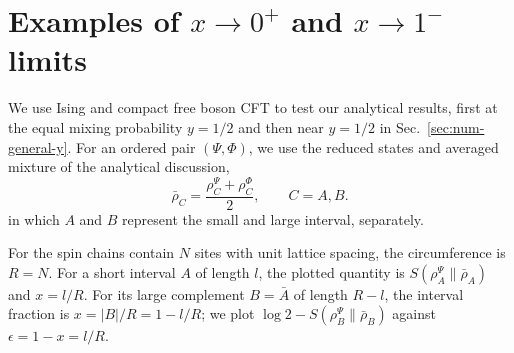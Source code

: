 \documentclass[11pt]{article}
\newcommand{\ep}{\epsilon}
\newcommand{\mO}{\mathcal{O}}
\newcommand{\nn}{\nonumber}
\newcommand{\NL}[1]{\textcolor{blue}{#1}}
\begin{document}


\section{\texorpdfstring{Examples of $x\to 0^+$ and $x\to 1^-$ limits}
{Examples of x->0+ and x->1- limits}}
\label{sec:num-examples}

We use Ising and compact free boson CFT to test our analytical results, first at the equal mixing probability $y=1/2$ and then near $y=1/2$ in Sec.~\ref{sec:num-general-y}. For an ordered pair $(\Psi,\Phi)$,
we use the reduced states and averaged mixture of the analytical
discussion,
\begin{equation}
\bar\rho_C=\frac{\rho_C^\Psi+\rho_C^\Phi}{2},\qquad C=A,B.
 \label{eq:num-observables}
\end{equation}
in which $A$ and $B$ represent the small and large interval, separately.

For the spin chains contain $N$ sites with unit lattice spacing, the circumference is $R=N$. For a short interval $A$ of length $l$, the plotted quantity is $S(\rho_A^\Psi\|\bar\rho_A)$ and $x=l/R$. For its large complement $B=\bar{A}$ of length $R-l$, the interval
fraction is $x=|B|/R=1-l/R$; we plot
$\log2-S(\rho_B^\Psi\|\bar\rho_B)$ against
$\ep=1-x=l/R$.
\end{document}
